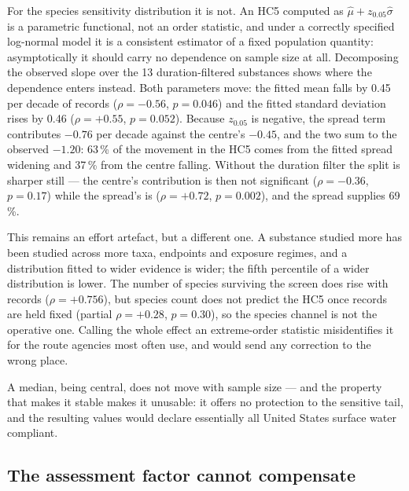 \documentclass[preprint,12pt]{elsarticle}
\begin{document}
For the species sensitivity distribution it is not. An HC5 computed as
$\hat{\mu} + z_{0.05}\hat{\sigma}$ is a parametric functional, not an order
statistic, and under a correctly specified log-normal model it is a consistent
estimator of a fixed population quantity: asymptotically it should carry no
dependence on sample size at all. Decomposing the observed slope over the 13
duration-filtered substances shows where the dependence enters instead. Both
parameters move: the fitted mean falls by 0.45 per decade of records
($\rho = -0.56$, $p = 0.046$) and the fitted standard deviation rises by 0.46
($\rho = +0.55$, $p = 0.052$). Because $z_{0.05}$ is negative, the spread term
contributes $-0.76$ per decade against the centre's $-0.45$, and the two sum to
the observed $-1.20$: 63\,\% of the movement in the HC5 comes from the fitted
spread widening and 37\,\% from the centre falling. Without the duration
filter the split is sharper still --- the centre's contribution is then not
significant ($\rho = -0.36$, $p = 0.17$) while the spread's is
($\rho = +0.72$, $p = 0.002$), and the spread supplies 69\,\%.

This remains an effort artefact, but a different one. A substance studied more
has been studied across more taxa, endpoints and exposure regimes, and a
distribution fitted to wider evidence is wider; the fifth percentile of a wider
distribution is lower. The number of species surviving the screen does rise
with records ($\rho = +0.756$), but species count does
not predict the HC5 once records are held fixed (partial $\rho = +0.28$,
$p = 0.30$), so the species channel is not the operative one. Calling the whole
effect an extreme-order statistic misidentifies it for the route agencies most
often use, and would send any correction to the wrong place.

A median, being central, does not move with sample size --- and the property
that makes it stable makes it unusable: it offers no protection to the
sensitive tail, and the resulting values would declare essentially all United
States surface water compliant.

\subsection{The assessment factor cannot compensate}
\end{document}
